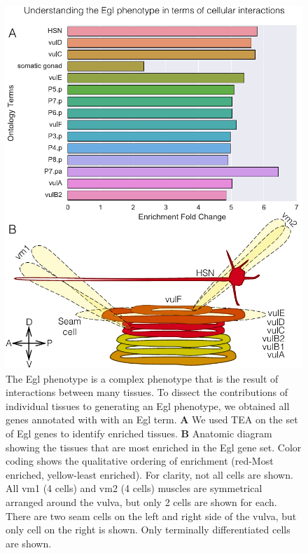 \documentclass[10pt,letterpaper,twocolumn]{article}
\begin{document}
\begin{figure}[htbp]
  \renewcommand{\familydefault}{\sfdefault}\normalfont{}
  \centering
  \includegraphics[width=\linewidth]{Egl-phenotype.pdf}
  \caption{The Egl phenotype is a complex phenotype that is the result of
  interactions between many tissues. To dissect the contributions of individual
  tissues to generating an Egl phenotype, we obtained all genes annotated with
  with an Egl term. \textbf{A} We used TEA on the set of Egl genes to identify
  enriched tissues. \textbf{B} Anatomic diagram showing the tissues that are
  most enriched in the Egl gene set. Color coding shows the qualitative
  ordering of enrichment (red-Most enriched, yellow-least enriched). For clarity,
  not all cells are shown. All vm1 (4 cells) and vm2 (4 cells) muscles are
  symmetrical arranged around the vulva, but only 2 cells are shown for each.
  There are two seam cells on the left and right side of the vulva, but only
  cell on the right is shown. Only terminally differentiated cells are shown.}
\label{fig:egl}
\end{figure}
\end{document}
